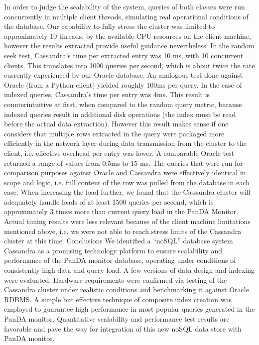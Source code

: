In order to judge the scalability of the system, queries of both classes were run concurrently in multiple client threads, simulating real operational conditions of the database. Our capability to fully stress the cluster was limited to approximately 10 threads, by the available CPU resources on the client machine, however the results extracted provide useful guidance nevertheless.
In the random seek test, Cassandra’s time per extracted entry was 10 ms, with 10 concurrent clients. This translates into 1000 queries per second, which is about twice the rate currently experienced by our Oracle database. An analogous test done against Oracle (from a Python client) yielded roughly 100ms per query.
In the case of indexed queries, Cassandra’s time per entry was 4ms. This result is counterintuitive at first, when compared to the random query metric, because indexed queries result in additional disk operations (the index must be read before the actual data extraction). However this result makes sense  if one considers that multiple rows extracted in the query were packaged more efficiently in the network layer during data transmission from the cluster to the client, i.e. effective overhead per entry was lower. A comparable Oracle test returned a range of values from 0.5ms to 15 ms.
The queries that were run for comparison purposes against Oracle and Cassandra were effectively identical in scope and logic, i.e. full content of the row was pulled from the database in each case.
When increasing the load further, we found that the Cassandra cluster will adequately handle loads of at least 1500 queries per second, which is approximately 3 times more than current query load in the PanDA Monitor. Actual timing results were less relevant because of the client machine limitations mentioned above, i.e. we were not able to reach stress limits of the Cassandra cluster at this time.
Conclusions
We identified a “noSQL” database system Cassandra as a promising technology platform to ensure scalability and performance of the PanDA monitor database, operating under conditions of consistently high data and query load. A few versions of data design and indexing were evaluated. Hardware requirements were confirmed via testing of the Cassandra cluster under realistic conditions and benchmarking it against Oracle RDBMS. A simple but effective technique of composite index creation was employed to guarantee high performance in most popular queries generated in the PanDA monitor. Quantitative scalability and performance test results are favorable and pave the way for integration of this new noSQL data store with PanDA monitor.








